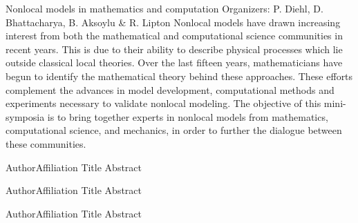 \label{mini02}

\miniabs
{Nonlocal models in mathematics and computation}
{Organizers: P. Diehl, D. Bhattacharya, B. Aksoylu \& R. Lipton}
{Nonlocal models have drawn increasing interest from both the mathematical and computational science communities in recent years. This is due to their ability to describe physical processes which lie outside classical local theories. Over the last fifteen years, mathematicians have begun to identify the mathematical theory behind these approaches. These efforts complement the advances in model development, computational methods and experiments necessary to validate nonlocal modeling. The objective of this mini-symposia is to bring together experts in nonlocal models from mathematics, computational science, and mechanics, in order to further the dialogue between these communities.}
\vspace{2ex}



\abs
{Author}{Affiliation}
{Title}
{Abstract
}

\vspace{1.5ex}

\abs
{Author}{Affiliation}
{Title}
{Abstract
}

\vspace{1.5ex}

\abs
{Author}{Affiliation}
{Title}
{Abstract
}
